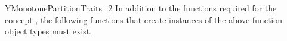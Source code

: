 \begin{ccRefConcept}{YMonotonePartitionTraits_2}
In addition to the functions required for the concept ,
the following functions that create instances of the above function 
object types must exist.




\ccHasModels


%

\end{ccRefConcept}


